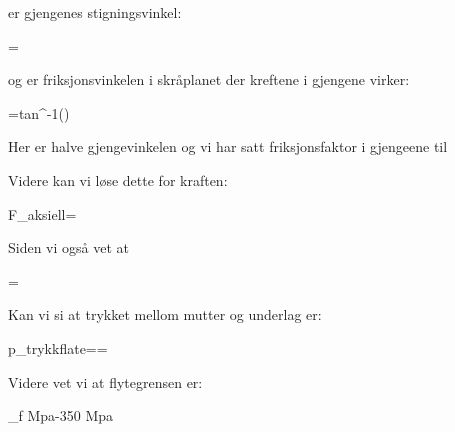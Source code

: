 \varphi er gjengenes stigningsvinkel:

\varphi =

og \varepsilon er friksjonsvinkelen i skråplanet der kreftene i gjengene virker:

\varepsilon =tan^{-1}()

Her er \alpha halve gjengevinkelen og vi har satt friksjonsfaktor i gjengeene til  \cite{FriksjonsfaktorGjenger} %

Videre kan vi løse dette for kraften:

F_{aksiell}=

Siden vi også vet at

\sigma=

Kan vi si at trykket mellom mutter og underlag er:

p_{trykkflate}==

Videre vet vi at flytegrensen er:


\sigma _{f} Mpa-350 Mpa